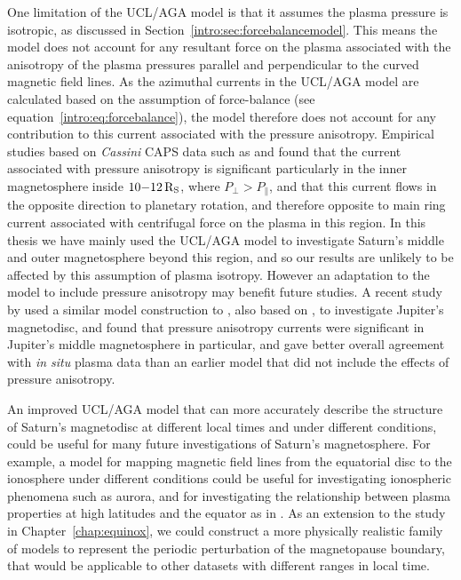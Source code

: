 One limitation of the UCL/AGA model is that it assumes the plasma pressure is isotropic, as discussed in Section~\ref{intro:sec:forcebalancemodel}.  This means the model does not account for any resultant force on the plasma associated with the anisotropy of the plasma pressures parallel and perpendicular to the curved magnetic field lines. As the azimuthal currents in the UCL/AGA model are calculated based on the assumption of force-balance (see equation~\ref{intro:eq:forcebalance}), the model therefore does not account for any contribution to this current associated with the pressure anisotropy. Empirical studies based on \textit{Cassini} CAPS data such as \citet{sergis2010} and \citet{kellett2011} found that the current associated with pressure anisotropy is significant particularly in the inner magnetosphere inside $10{\--}\SI{12}{R_S}$, where $P_\perp > P_\parallel$, and that this current flows in the opposite direction  to planetary rotation, and therefore opposite to main ring current associated with centrifugal force on the plasma in this region. In this thesis we have mainly  used the UCL/AGA model to investigate Saturn's middle and outer magnetosphere beyond this region, and so our results are unlikely to be affected by this assumption of plasma isotropy. However an adaptation to the model to include pressure anisotropy may benefit future studies. A recent study by \citet{nichols2015} used a similar model construction to \citet{achilleos2010a}, also based on \citet{caudal1986}, to investigate Jupiter's magnetodisc, and found that pressure anisotropy currents were significant in Jupiter's middle magnetosphere in particular, and gave better overall agreement with \textit{in situ} plasma data than an earlier model \citep{nichols2011} that did not include the effects of pressure anisotropy.

An improved UCL/AGA model that can more accurately describe the structure of Saturn's magnetodisc at different local times and under different conditions, could be useful for many future investigations of Saturn's magnetosphere. For example, a model for  mapping magnetic field lines from the equatorial disc to the ionosphere under  different conditions could be useful for investigating ionospheric phenomena such as aurora, and for investigating the relationship between plasma properties at high latitudes and the equator as in \citet{sergis2018}. As an extension to the study  in Chapter~\ref{chap:equinox}, we could construct a  more physically realistic family of models to represent the periodic perturbation of the magnetopause boundary, that would be applicable to other datasets with different ranges in local time.

